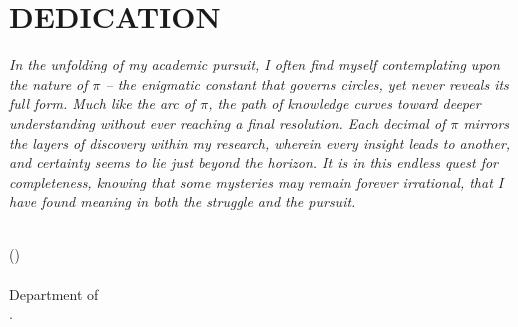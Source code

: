 \pagestyle{empty}

\chapter*{DEDICATION}
    \def\baselinestretch{1.0}
    \par\textsl{In the unfolding of my academic pursuit, I often find myself contemplating upon the nature of $\pi$ -- the enigmatic constant that governs circles, yet never reveals its full form. Much like the arc of $\pi$, the path of knowledge curves toward deeper understanding without ever reaching a final resolution. Each decimal of $\pi$ mirrors the layers of discovery within my research, wherein every insight leads to another, and certainty seems to lie just beyond the horizon. It is in this endless quest for completeness, knowing that some mysteries may remain forever irrational, that I have found meaning in both the struggle and the pursuit.}
    
    \bigskip\medskip
    \bigskip\medskip
    \bigskip\medskip\bigskip\medskip
    \noindent\\
    \hfill (\authorname)
    \noindent\\
    \hfill {\submissiontime} \\
    \hfill Department of \department\\
    \hfill \university.
